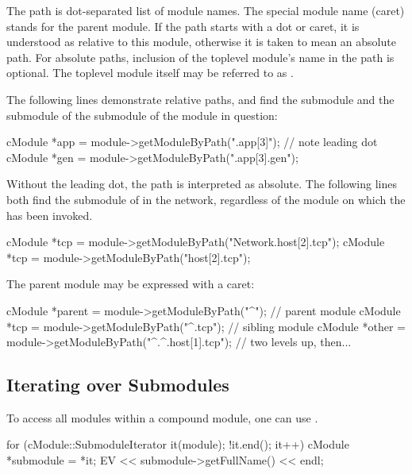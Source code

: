 The path is dot-separated list of module names. The special module name
\ttt{\textasciicircum} (caret) stands for the parent module. If the path
starts with a dot or caret, it is understood as relative to this module,
otherwise it is taken to mean an absolute path. For absolute paths,
inclusion of the toplevel module's name in the path is optional.
The toplevel module itself may be referred to as .

The following lines demonstrate relative paths, and find the 
submodule and the  submodule of the  submodule of the
module in question:

\begin{cpp}
cModule *app = module->getModuleByPath(".app[3]");  // note leading dot
cModule *gen = module->getModuleByPath(".app[3].gen");
\end{cpp}

Without the leading dot, the path is interpreted as absolute. The following
lines both find the  submodule of  in the network,
regardless of the module on which the  has been
invoked.

\begin{cpp}
cModule *tcp = module->getModuleByPath("Network.host[2].tcp");
cModule *tcp = module->getModuleByPath("host[2].tcp");
\end{cpp}

The parent module may be expressed with a caret:

\begin{cpp}
cModule *parent = module->getModuleByPath("^"); // parent module
cModule *tcp = module->getModuleByPath("^.tcp"); // sibling module
cModule *other = module->getModuleByPath("^.^.host[1].tcp"); // two levels up, then...
\end{cpp}


\subsection{Iterating over Submodules}
\label{sec:simple-modules:iterating-over-submodules}

To access all modules within a compound module,
one can use .

\begin{cpp}
for (cModule::SubmoduleIterator it(module); !it.end(); it++) {
    cModule *submodule = *it;
    EV << submodule->getFullName() << endl;
}
\end{cpp}


